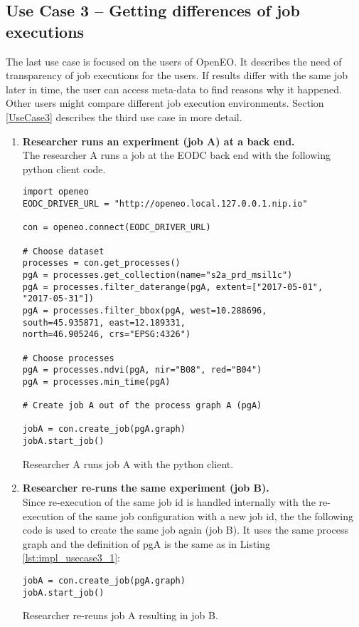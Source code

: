 \documentclass[draft,final]{vutinfth} %
\newenvironment{code}{\captionsetup{type=listing}}{}
\begin{document}
\subsection{Use Case 3 – Getting differences of job executions}\label{Implementation:Use Case3}
The last use case is focused on the users of OpenEO. It describes the need of transparency of job executions for the users. If results differ with the same job later in time, the user can access meta-data to find reasons why it happened. Other users might compare different job execution environments. Section \ref{UseCase3} describes the third use case in more detail.  
\begin{enumerate}
	\item \textbf{Researcher runs an experiment (job A) at a back end.}\\
	The researcher A runs a job at the EODC back end with the following python client code. 

\begin{code}
	\begin{verbatim}
import openeo
EODC_DRIVER_URL = "http://openeo.local.127.0.0.1.nip.io"

con = openeo.connect(EODC_DRIVER_URL)

# Choose dataset
processes = con.get_processes()
pgA = processes.get_collection(name="s2a_prd_msil1c")
pgA = processes.filter_daterange(pgA, extent=["2017-05-01", 
"2017-05-31"])
pgA = processes.filter_bbox(pgA, west=10.288696, 
south=45.935871, east=12.189331, 
north=46.905246, crs="EPSG:4326")

# Choose processes
pgA = processes.ndvi(pgA, nir="B08", red="B04")
pgA = processes.min_time(pgA)

# Create job A out of the process graph A (pgA)

jobA = con.create_job(pgA.graph)
jobA.start_job()
	\end{verbatim}
	\caption{Researcher A runs job A with the python client.}
	\label{lst:impl_usecase3_1}
\end{code}
	\item \textbf{Researcher re-runs the same experiment (job B).}\\
	Since re-execution of the same job id is handled internally with the re-execution of the same job configuration with a new job id, the the following code is used to create the same job again (job B). It uses the same process graph and the definition of pgA is the same as in Listing \ref{lst:impl_usecase3_1}:
\begin{code}
	\begin{verbatim}
jobA = con.create_job(pgA.graph)
jobA.start_job()
	\end{verbatim}
	\caption{Researcher re-reuns job A resulting in job B.}
	\label{lst:impl_usecase3_2}
\end{code}
	

\end{enumerate}
\end{document}

